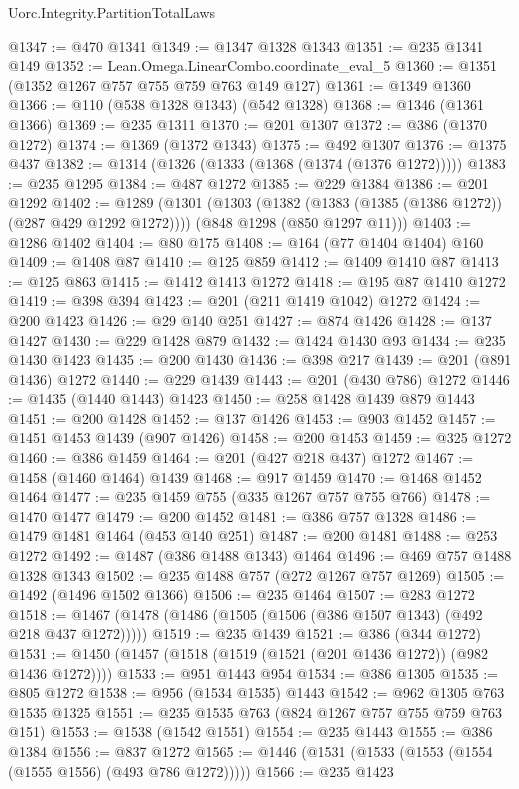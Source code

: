 \begin{lexlean}{Uorc.Integrity.PartitionTotalLaws}
\begin{coremodule}
@1347 := @470 @1341
@1349 := @1347 @1328 @1343
@1351 := @235 @1341 @149
@1352 := Lean.Omega.LinearCombo.coordinate_eval_5
@1360 := @1351 (@1352 @1267 @757 @755 @759 @763 @149 @127)
@1361 := @1349 @1360
@1366 := @110 (@538 @1328 @1343) (@542 @1328)
@1368 := @1346 (@1361 @1366)
@1369 := @235 @1311
@1370 := @201 @1307
@1372 := @386 (@1370 @1272)
@1374 := @1369 (@1372 @1343)
@1375 := @492 @1307
@1376 := @1375 @437
@1382 := @1314 (@1326 (@1333 (@1368 (@1374 (@1376 @1272)))))
@1383 := @235 @1295
@1384 := @487 @1272
@1385 := @229 @1384
@1386 := @201 @1292
@1402 := @1289
    (@1301
      (@1303 (@1382 (@1383 (@1385 (@1386 @1272)) (@287 @429 @1292 @1272))))
      (@848 @1298 (@850 @1297 @11)))
@1403 := @1286 @1402
@1404 := @80 @175
@1408 := @164 (@77 @1404 @1404) @160
@1409 := @1408 @87
@1410 := @125 @859
@1412 := @1409 @1410 @87
@1413 := @125 @863
@1415 := @1412 @1413 @1272
@1418 := @195 @87 @1410 @1272
@1419 := @398 @394
@1423 := @201 (@211 @1419 @1042) @1272
@1424 := @200 @1423
@1426 := @29 @140 @251
@1427 := @874 @1426
@1428 := @137 @1427
@1430 := @229 @1428 @879
@1432 := @1424 @1430 @93
@1434 := @235 @1430 @1423
@1435 := @200 @1430
@1436 := @398 @217
@1439 := @201 (@891 @1436) @1272
@1440 := @229 @1439
@1443 := @201 (@430 @786) @1272
@1446 := @1435 (@1440 @1443) @1423
@1450 := @258 @1428 @1439 @879 @1443
@1451 := @200 @1428
@1452 := @137 @1426
@1453 := @903 @1452
@1457 := @1451 @1453 @1439 (@907 @1426)
@1458 := @200 @1453
@1459 := @325 @1272
@1460 := @386 @1459
@1464 := @201 (@427 @218 @437) @1272
@1467 := @1458 (@1460 @1464) @1439
@1468 := @917 @1459
@1470 := @1468 @1452 @1464
@1477 := @235 @1459 @755 (@335 @1267 @757 @755 @766)
@1478 := @1470 @1477
@1479 := @200 @1452
@1481 := @386 @757 @1328
@1486 := @1479 @1481 @1464 (@453 @140 @251)
@1487 := @200 @1481
@1488 := @253 @1272
@1492 := @1487 (@386 @1488 @1343) @1464
@1496 := @469 @757 @1488 @1328 @1343
@1502 := @235 @1488 @757 (@272 @1267 @757 @1269)
@1505 := @1492 (@1496 @1502 @1366)
@1506 := @235 @1464
@1507 := @283 @1272
@1518 := @1467 (@1478 (@1486 (@1505 (@1506 (@386 @1507 @1343) (@492 @218 @437 @1272)))))
@1519 := @235 @1439
@1521 := @386 (@344 @1272)
@1531 := @1450 (@1457 (@1518 (@1519 (@1521 (@201 @1436 @1272)) (@982 @1436 @1272))))
@1533 := @951 @1443 @954
@1534 := @386 @1305
@1535 := @805 @1272
@1538 := @956 (@1534 @1535) @1443
@1542 := @962 @1305 @763 @1535 @1325
@1551 := @235 @1535 @763 (@824 @1267 @757 @755 @759 @763 @151)
@1553 := @1538 (@1542 @1551)
@1554 := @235 @1443
@1555 := @386 @1384
@1556 := @837 @1272
@1565 := @1446 (@1531 (@1533 (@1553 (@1554 (@1555 @1556) (@493 @786 @1272)))))
@1566 := @235 @1423

\end{coremodule}
\end{lexlean}
